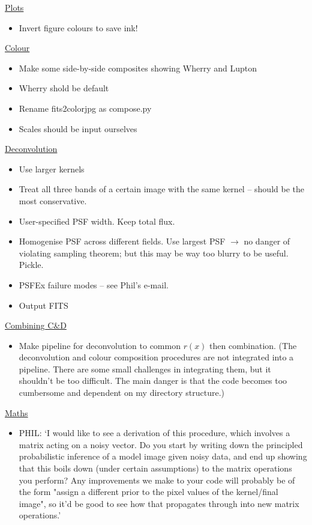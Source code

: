 \documentclass[letterpaper, 11pt]{article}
\def\TODO#1{ {\color{red}{\bf TODO: {#1}}}\xspace}
\begin{document}
\underline{Plots}
\begin{itemize}
	\item Invert figure colours to save ink!\\[Latex can't do this; will have to make them myself.]
\end{itemize}

\underline{Colour}
\begin{itemize}
	\item Make some side-by-side composites showing Wherry and Lupton
	\item Wherry shold be default
	\item Rename fits2colorjpg as compose.py
	\item Scales should be input ourselves
\end{itemize}

\underline{Deconvolution}
\begin{itemize}
	\item Use larger kernels
	\item Treat all three bands of a certain image with the same kernel -- should be the most conservative.
	\item User-specified PSF width. Keep total flux.
	\item Homogenise PSF across different fields. \TODO{What is the best way to do this?} Use largest PSF $\rightarrow$ no danger of violating sampling theorem; but this may be way too blurry to be useful. Pickle.
	\item PSFEx failure modes -- see Phil's e-mail.
	\item Output FITS
\end{itemize}

\underline{Combining C\&D}
\begin{itemize}
	\item Make pipeline for deconvolution to common $r(x)$ then combination. (The deconvolution and colour composition procedures are not integrated into a pipeline. There are some small challenges in integrating them, but it shouldn't be too difficult. The main danger is that the code becomes too cumbersome and dependent on my directory structure.)
\end{itemize}

\underline{Maths}
\begin{itemize}
	\item PHIL: `I would like to see a derivation of this procedure, which involves a
matrix acting on a noisy vector. Do you start by writing down the
principled probabilistic inference of a model image given noisy data,
and end up showing that this boils down (under certain assumptions) to
the matrix operations you perform? Any improvements we make to your
code will probably be of the form "assign a different prior to the
pixel values of the kernel/final image", so it'd be good to see how
that propagates through into new matrix operations.'
\end{itemize}
\end{document}
